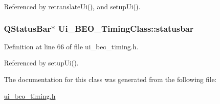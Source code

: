 Referenced by retranslateUi(), and setupUi().\hypertarget{class_ui___b_e_o___timing_class_29a2b80779ba872f4a5fad93641d82ce}{
\subsubsection[statusbar]{\setlength{\rightskip}{0pt plus 5cm}QStatusBar$\ast$ {\bf Ui\_\-BEO\_\-TimingClass::statusbar}}}
\label{class_ui___b_e_o___timing_class_29a2b80779ba872f4a5fad93641d82ce}




Definition at line 66 of file ui\_\-beo\_\-timing.h.

Referenced by setupUi().

The documentation for this class was generated from the following file:\begin{CompactItemize}
\item 
\hyperlink{ui__beo__timing_8h}{ui\_\-beo\_\-timing.h}\end{CompactItemize}
